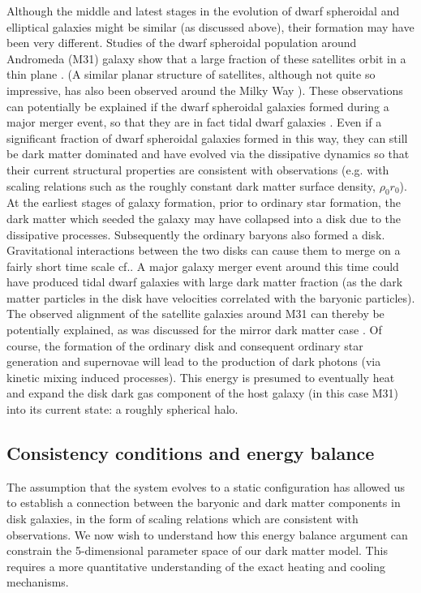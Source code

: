 \documentclass[12pt]{article}
\begin{document}
{{Although the middle and latest stages in the evolution of dwarf
spheroidal and elliptical galaxies might be similar (as discussed
above),
their formation may have been very different. 
Studies of the dwarf spheroidal population around Andromeda (M31) galaxy
show that a large fraction of these satellites orbit in a thin plane
\cite{plan1}. 
(A similar planar structure of satellites, although not quite so
impressive, has also been observed around the Milky Way \cite{plan2}).
These
observations can potentially be explained if the dwarf spheroidal
galaxies formed during a major merger event, so that they are in fact
tidal dwarf galaxies \cite{Kroupa}. Even if a significant fraction of
dwarf spheroidal galaxies formed in this way, 
they can still be dark matter dominated and have evolved via the
dissipative dynamics 
so that their current structural properties are consistent 
with observations (e.g. with scaling relations such as the roughly
constant dark matter surface density, $\rho_0 r_0$).
At the earliest stages of galaxy formation, prior to ordinary star
formation, the dark matter which seeded
the galaxy may have collapsed into a disk due to the dissipative
processes.
Subsequently the ordinary baryons also formed a disk. Gravitational
interactions between the two disks
can cause them to merge on a fairly short time scale cf.\cite{dddm}.
A major galaxy merger event around this time could have produced tidal
dwarf galaxies with large dark matter fraction
(as the dark matter particles in the disk have velocities correlated
with the baryonic particles).
The observed alignment of the satellite galaxies around M31
can thereby be potentially explained, 
as was discussed for the mirror dark matter case \cite{footsil}.
Of course, the formation of the ordinary disk and consequent ordinary
star generation and supernovae will lead 
to the production of dark photons (via kinetic mixing induced
processes).
This energy is presumed to eventually heat and expand the disk dark gas
component of the host galaxy (in this case M31)
into its current state: a roughly spherical halo.

\subsection{Consistency conditions and energy balance}

The assumption that the system evolves to a static configuration has
allowed us to establish a connection between the baryonic and dark
matter components in disk galaxies, in the form of scaling relations
which are consistent with observations. We now wish to understand how
this energy balance argument can constrain the 5-dimensional parameter
space of our dark matter model. This requires a more quantitative
understanding of the exact heating and cooling mechanisms.

}}
\end{document}
